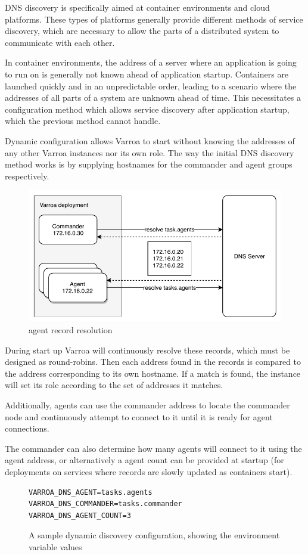 DNS discovery is specifically aimed at container environments and cloud platforms. These types of platforms generally provide different methods of service discovery, which are necessary to allow the parts of a distributed system to communicate with each other.

In container environments, the address of a server where an application is going to run on is generally not known ahead of application startup. Containers are launched quickly and in an unpredictable order, leading to a scenario where the addresses of all parts of a system are unknown ahead of time. This necessitates a configuration method which allows service discovery after application startup, which the previous method cannot handle.


Dynamic configuration allows Varroa to start without knowing the addresses of any other Varroa instances nor its own role. The way the initial DNS discovery method works is by supplying hostnames for the commander and agent groups respectively.


\begin{figure}[h]
\begin{center}
\includegraphics[scale=0.8]{Resources/PDF/ExecutionDnsDiscovery}
\caption{agent record resolution}
\end{center}
\end{figure}

During start up Varroa will continuously resolve these records, which must be designed as round-robins.
Then each address found in the records is compared to the address corresponding to its own hostname. 
If a match is found, the instance will set its role according to the set of addresses it matches.

Additionally, agents can use the commander address to locate the commander node and continuously attempt to connect to it until it is ready for agent connections.

The commander can also determine how many agents will connect to it using the agent address, or alternatively a agent count can be  provided at startup (for deployments on services where records are slowly updated as containers start).

\begin{figure}
\begin{lstlisting}
VARROA_DNS_AGENT=tasks.agents
VARROA_DNS_COMMANDER=tasks.commander
VARROA_DNS_AGENT_COUNT=3
\end{lstlisting}
\caption{A sample dynamic discovery configuration, showing the environment variable values}
\end{figure}
